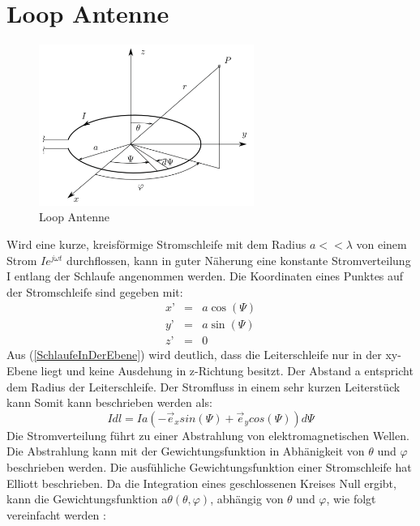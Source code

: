 
\section{Loop Antenne}\label{sec:LoopAntenneTheorie}
\begin{figure}[h]
	\centering
	\includegraphics[width=7cm]{content/bilder/Loop_EMANT_S45.pdf}%
	\caption{Loop Antenne}
	\label{LoopAntenne}
\end{figure}
Wird eine kurze, kreisförmige Stromschleife mit dem Radius $a<<\lambda$ von einem Strom $Ie^{j\omega t}$ durchflossen, kann in guter Näherung eine konstante Stromverteilung I entlang der Schlaufe angenommen werden. Die Koordinaten eines Punktes auf der Stromschleife sind gegeben mit:
\begin{eqnarray}
x’ &=& a \cos(\Psi)\\
y’ &=& a \sin(\Psi)\\
z’ &=& 0\label{SchlaufeInDerEbene}
\end{eqnarray}
Aus  (\ref{SchlaufeInDerEbene}) wird deutlich, dass die Leiterschleife nur in der xy-Ebene liegt und keine Ausdehung in z-Richtung besitzt. Der Abstand a entspricht dem Radius der Leiterschleife. Der Stromfluss in einem sehr kurzen Leiterstück kann Somit kann beschrieben werden als:
\begin{equation}
I dl= Ia(- \vec e_{x}sin(\Psi)+\vec e_{y}cos(\Psi))d\Psi
\end{equation}
Die Stromverteilung führt zu einer Abstrahlung von elektromagnetischen Wellen. Die Abstrahlung kann mit der Gewichtungsfunktion in Abhänigkeit von $\theta$ und $\varphi$ beschrieben werden. Die ausfühliche Gewichtungsfunktion einer Stromschleife hat Elliott \cite{elliott1981antenna} beschrieben. Da die Integration eines geschlossenen Kreises Null ergibt, kann die Gewichtungsfunktion a$\theta(\theta, \varphi)$, abhängig von $\theta$ und $\varphi$, wie folgt vereinfacht werden \cite{Emant}:
